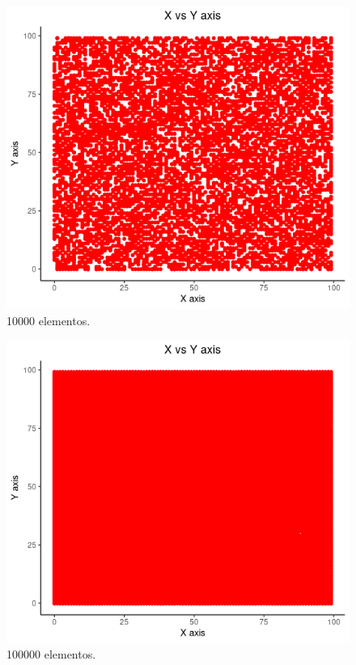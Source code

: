 \documentclass[paper=a4, fontsize=11pt]{scrartcl} %
\numberwithin{equation}{section} %
\numberwithin{figure}{section} %
\numberwithin{table}{section} %
\begin{document}
\begin{figure}
    \includegraphics[width=\linewidth]{Rplot3.png}
    \caption{10000 elementos.}
\end{figure}



\begin{figure}
    \includegraphics[width=\linewidth]{Rplot4.png}
    \caption{100000 elementos.}
\end{figure}
\end{document}
